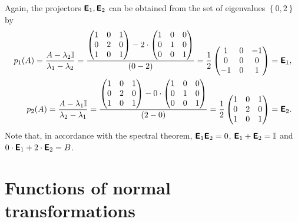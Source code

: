 {Again, the projectors $\textsf{\textbf{E}}_1, \textsf{\textbf{E}}_2$
can be obtained from  the set of eigenvalues $\left\{  0,2 \right\}$ by
\begin{equation}
\begin{split}
p_1(A)=   \frac{A-\lambda_2{\Bbb I}}{\lambda_1-\lambda_2}
=
\frac{
\begin{pmatrix}
1&0&1\\
0&2&0\\
1&0&1
\end{pmatrix}
-
2\cdot
\begin{pmatrix}
1&0&0\\
0&1&0\\
0&0&1
\end{pmatrix}
}
{(0-2)}
=
\frac{1}{2}
\begin{pmatrix}
1&0&-1\\
0&0&0\\
-1&0&1
\end{pmatrix}
=\textsf{\textbf{E}}_1
,\\
p_2(A)=   \frac{A-\lambda_1{\Bbb I}}{\lambda_2-\lambda_1}
=
\frac{
\begin{pmatrix}
1&0&1\\
0&2&0\\
1&0&1
\end{pmatrix}
-
0\cdot
\begin{pmatrix}
1&0&0\\
0&1&0\\
0&0&1
\end{pmatrix}
}
{(2-0)}
=
\frac{1}{2}
\begin{pmatrix}
1&0&1\\
0&2&0\\
1&0&1
\end{pmatrix}
=\textsf{\textbf{E}}_2.
\end{split}
\end{equation}
Note that, in accordance with the spectral theorem,
$\textsf{\textbf{E}}_1 \textsf{\textbf{E}}_2=0 $,
$\textsf{\textbf{E}}_1+\textsf{\textbf{E}}_2={\Bbb I}$
and
$0\cdot \textsf{\textbf{E}}_1+2\cdot \textsf{\textbf{E}}_2=B$.

\eexample
}







\section{Functions of normal transformations}

